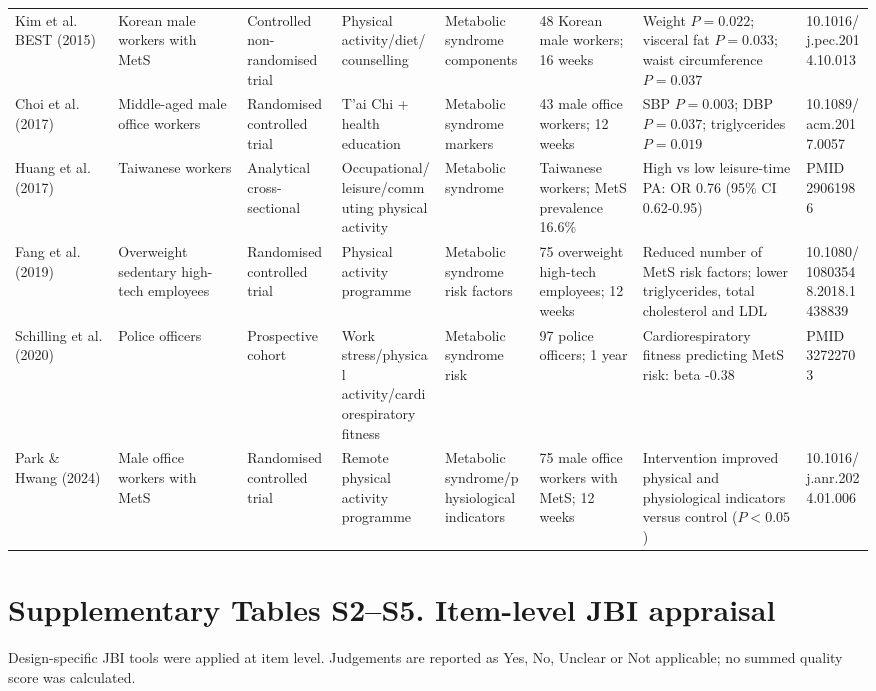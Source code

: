 \documentclass[10pt]{article}
\begin{document}
\begin{landscape}
\begin{longtable}{p{0.12\linewidth} p{0.15\linewidth} p{0.11\linewidth} p{0.12\linewidth} p{0.11\linewidth} p{0.12\linewidth} p{0.19\linewidth} p{0.08\linewidth}}
Kim et al. BEST (2015) & Korean male workers with MetS & Controlled non-randomised trial & Physical activity/diet/counselling & Metabolic syndrome components & 48 Korean male workers; 16 weeks & Weight \(P = 0.022\); visceral fat \(P = 0.033\); waist circumference \(P = 0.037\) & 10.1016/j.pec.2014.10.013 \\
Choi et al. (2017) & Middle-aged male office workers & Randomised controlled trial & T'ai Chi + health education & Metabolic syndrome markers & 43 male office workers; 12 weeks & SBP \(P = 0.003\); DBP \(P = 0.037\); triglycerides \(P = 0.019\) & 10.1089/acm.2017.0057 \\
Huang et al. (2017) & Taiwanese workers & Analytical cross-sectional & Occupational/leisure/commuting physical activity & Metabolic syndrome & Taiwanese workers; MetS prevalence 16.6\% & High vs low leisure-time PA: OR 0.76 (95\% CI 0.62-0.95) & PMID 29061986 \\
Fang et al. (2019) & Overweight sedentary high-tech employees & Randomised controlled trial & Physical activity programme & Metabolic syndrome risk factors & 75 overweight high-tech employees; 12 weeks & Reduced number of MetS risk factors; lower triglycerides, total cholesterol and LDL & 10.1080/10803548.2018.1438839 \\
Schilling et al. (2020) & Police officers & Prospective cohort & Work stress/physical activity/cardiorespiratory fitness & Metabolic syndrome risk & 97 police officers; 1 year & Cardiorespiratory fitness predicting MetS risk: beta -0.38 & PMID 32722703 \\
Park \& Hwang (2024) & Male office workers with MetS & Randomised controlled trial & Remote physical activity programme & Metabolic syndrome/physiological indicators & 75 male office workers with MetS; 12 weeks & Intervention improved physical and physiological indicators versus control (\(P < 0.05\)) & 10.1016/j.anr.2024.01.006 \\
\bottomrule
\end{longtable}
\end{landscape}
\normalsize

\section*{Supplementary Tables S2--S5. Item-level JBI appraisal}

Design-specific JBI tools were applied at item level. Judgements are reported as Yes, No, Unclear or Not applicable; no summed quality score was calculated.
\end{document}
